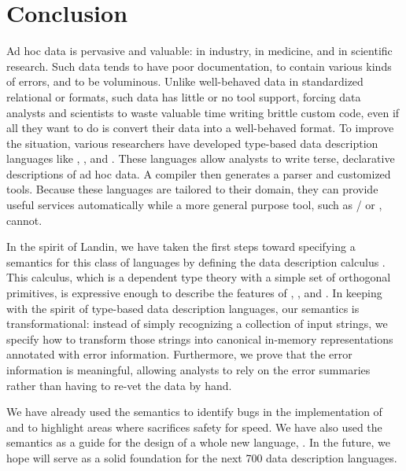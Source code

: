 \section{Conclusion} 
\label{sec:conclusion}

Ad hoc data is pervasive and valuable: in industry, in medicine, and
in scientific research.  Such data tends to have poor documentation,
to contain various kinds of errors, and to be voluminous.  Unlike
well-behaved data in standardized relational or \xml{} formats, such
data has little or no tool support, forcing data analysts and
scientists to waste valuable time writing brittle custom code, even if
all they want to do is convert their data into a well-behaved format.
To improve the situation, various researchers have developed type-based data
description languages like \pads{}, \datascript{}, and
\packettypes{}.  These languages allow analysts to write terse,
declarative descriptions of ad hoc data.  A compiler then generates a
parser and customized tools.  Because these languages are tailored to
their domain, they can provide useful services automatically while a
more general purpose tool, such as \lex{}/\yacc{} or \perl{}, cannot.

In the spirit of Landin, we have taken the first steps toward
specifying a semantics for this class of languages by defining the
data description calculus \ddc{}.  This calculus, which is a dependent
type theory with a simple set of orthogonal primitives, is expressive
enough to describe the features of \pads{}, \datascript{}, and
\packettypes{}.  In keeping with the spirit of type-based data description
languages, our semantics is transformational: instead of simply
recognizing a collection of input strings, we specify how to transform
those strings into canonical in-memory representations annotated with
error information.  Furthermore, we prove that the error information
is meaningful, allowing analysts to rely on the error summaries rather
than having to re-vet the data by hand.

We have already used the semantics to identify bugs in the
implementation of \padsc{} and to highlight areas where \padsc{}
sacrifices safety for speed.  We have also used the semantics as a guide
for the design of a whole new language, \padsml{}.  In the future, we hope 
\ddc{} will serve as a solid foundation for the next 700 data 
description languages.
